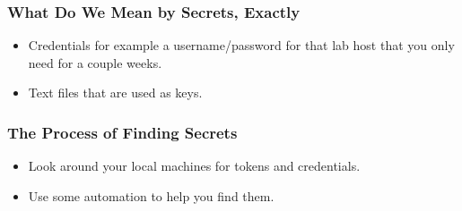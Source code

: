 \documentclass[aspectratio=169]{beamer}
\begin{document}
{
    \begin{frame}
        \frametitle{What Do We Mean by Secrets, Exactly}
    \begin{itemize}
        \item Credentials for example a username/password for that lab host that you only need for a couple weeks.
		\item Text files that are used as keys.
    \end{itemize}

    \end{frame}
}

{
    \begin{frame}
    \frametitle{The Process of Finding Secrets}
    \begin{itemize}
        \item Look around your local machines for tokens and credentials.
		\item Use some automation to help you find them.
    \end{itemize}
    \end{frame}
}
\end{document}
